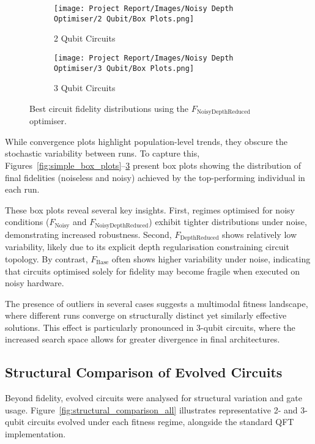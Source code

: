 \documentclass[11pt,a4paper]{article}
\begin{document}
\begin{figure}[H]
\centering
\begin{subfigure}{.5\textwidth}
  \centering
  \texttt{[image: Project Report/Images/Noisy Depth Optimiser/2 Qubit/Box Plots.png]}
  \caption{2 Qubit Circuits}
  \label{fig:noisydepth_box_2q}
\end{subfigure}%
\begin{subfigure}{.5\textwidth}
  \centering
  \texttt{[image: Project Report/Images/Noisy Depth Optimiser/3 Qubit/Box Plots.png]}
  \caption{3 Qubit Circuits}
  \label{fig:noisydepth_box_3q}
\end{subfigure}
\caption{Best circuit fidelity distributions using the $F_{\mathrm{NoisyDepthReduced}}$ optimiser.}
\label{fig:noisydepth_box_plots}
\end{figure}\newpage

While convergence plots highlight population-level trends, they obscure the stochastic variability between runs. To capture this, Figures~\ref{fig:simple_box_plots}–\ref{fig:noisydepth_box_plots} present box plots showing the distribution of final fidelities (noiseless and noisy) achieved by the top-performing individual in each run.\newline

These box plots reveal several key insights. First, regimes optimised for noisy conditions ($F_{\mathrm{Noisy}}$ and $F_{\mathrm{NoisyDepthReduced}}$) exhibit tighter distributions under noise, demonstrating increased robustness. Second, $F_{\mathrm{DepthReduced}}$ shows relatively low variability, likely due to its explicit depth regularisation constraining circuit topology. By contrast, $F_{\mathrm{Base}}$ often shows higher variability under noise, indicating that circuits optimised solely for fidelity may become fragile when executed on noisy hardware.\newline

The presence of outliers in several cases suggests a multimodal fitness landscape, where different runs converge on structurally distinct yet similarly effective solutions. This effect is particularly pronounced in 3-qubit circuits, where the increased search space allows for greater divergence in final architectures.


\subsection{Structural Comparison of Evolved Circuits}
Beyond fidelity, evolved circuits were analysed for structural variation and gate usage. Figure~\ref{fig:structural_comparison_all} illustrates representative 2- and 3-qubit circuits evolved under each fitness regime, alongside the standard QFT implementation.
\end{document}
